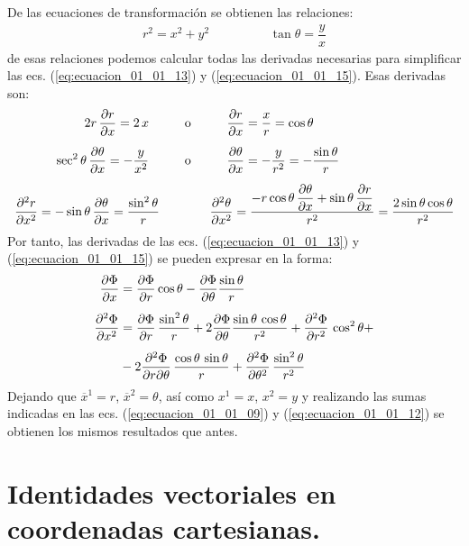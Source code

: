 \documentclass[hidelinks,12pt]{article}
\begin{document}
De las ecuaciones de transformación se obtienen las relaciones:
\begin{align*}
r^{2} = x^{2} + y^{2} \hspace{2cm} \tan \theta = \dfrac{y}{x}
\end{align*}
de esas relaciones podemos calcular todas las derivadas necesarias para simplificar las ecs. (\ref{eq:ecuacion_01_01_13}) y (\ref{eq:ecuacion_01_01_15}). Esas derivadas son:
\begin{align*}
2 r \, \pdv{r}{x} = 2 \, x \hspace{1cm} &\text{o} \hspace{1cm} \pdv{r}{x} = \dfrac{x}{r} = \cos \theta \\[0.5em]
\sec^{2} \theta \, \pdv{\theta}{x} = - \dfrac{y}{x^{2}} \hspace{1cm} &\text{o} \hspace{1cm} \pdv{\theta}{x} = - \dfrac{y}{r^{2}} = - \dfrac{\sin \theta}{r} \\[0.5em]
\pdv[2]{r}{x} = - \sin \theta \, \pdv{\theta}{x} = \dfrac{\sin^{2} \theta}{r} \hspace{0.7cm} &{} \hspace{0.7cm} \pdv[2]{\theta}{x} = \dfrac{\displaystyle - r \cos \theta \, \pdv{\theta}{x} + \sin \theta \, \pdv{r}{x}}{r^{2}} = \dfrac{2 \sin \theta \cos \theta}{r^{2}}
\end{align*}
Por tanto, las derivadas de las ecs. (\ref{eq:ecuacion_01_01_13}) y (\ref{eq:ecuacion_01_01_15}) se pueden expresar en la forma:
\begin{align*}
\pdv{\Phi}{x} &= \pdv{\Phi}{r} \cos \theta - \pdv{\Phi}{\theta} \dfrac{\sin \theta}{r} \\[0.5em]
\pdv[2]{\Phi}{x} &= \pdv{\Phi}{r} \, \dfrac{\sin^{2} \theta}{r} + 2 \pdv{\Phi}{\theta} \dfrac{\sin \theta \, \cos \theta}{r^{2}} + \pdv[2]{\Phi}{r} \, \cos^{2} \theta + \\[0.5em]
&- 2 \pdv[2]{\Phi}{r}{\theta} \, \dfrac{\cos \theta \, \sin \theta}{r} + \pdv[2]{\Phi}{\theta} \, \dfrac{\sin^{2} \theta}{r^{2}}
\end{align*}
Dejando que $\overline{x}^{1} = r$, $\overline{x}^{2} = \theta$, así como $x^{1} = x$, $x^{2} = y$ y realizando las sumas indicadas en las ecs. (\ref{eq:ecuacion_01_01_09}) y (\ref{eq:ecuacion_01_01_12}) se obtienen los mismos resultados que antes.

\section{Identidades vectoriales en coordenadas cartesianas.}
\end{document}

